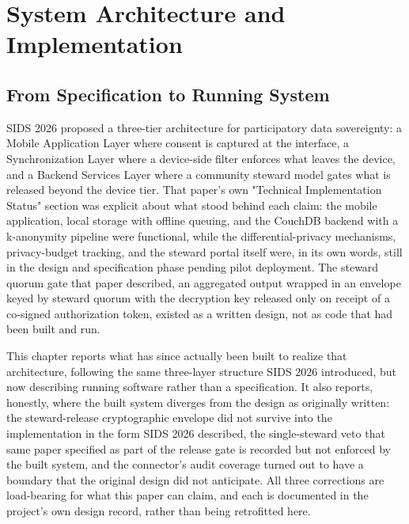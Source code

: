 \section{System Architecture and Implementation}

\subsection{From Specification to Running System}

SIDS 2026 \cite{katrakazas2026} proposed a three-tier architecture for participatory data sovereignty: a Mobile Application Layer where consent is captured at the interface, a Synchronization Layer where a device-side filter enforces what leaves the device, and a Backend Services Layer where a community steward model gates what is released beyond the device tier. That paper's own "Technical Implementation Status" section was explicit about what stood behind each claim: the mobile application, local storage with offline queuing, and the CouchDB backend with a k-anonymity pipeline were functional, while the differential-privacy mechanisms, privacy-budget tracking, and the steward portal itself were, in its own words, still in the design and specification phase pending pilot deployment. The steward quorum gate that paper described, an aggregated output wrapped in an envelope keyed by steward quorum with the decryption key released only on receipt of a co-signed authorization token, existed as a written design, not as code that had been built and run.

This chapter reports what has since actually been built to realize that architecture, following the same three-layer structure SIDS 2026 introduced, but now describing running software rather than a specification. It also reports, honestly, where the built system diverges from the design as originally written: the steward-release cryptographic envelope did not survive into the implementation in the form SIDS 2026 described, the single-steward veto that same paper specified as part of the release gate is recorded but not enforced by the built system, and the connector's audit coverage turned out to have a boundary that the original design did not anticipate. All three corrections are load-bearing for what this paper can claim, and each is documented in the project's own design record, rather than being retrofitted here.

